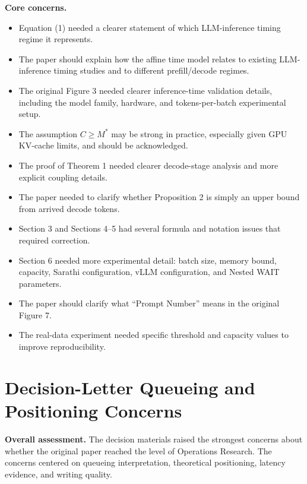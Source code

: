 \documentclass[11pt]{article}
\begin{document}
\textbf{Core concerns.}
\begin{itemize}
    \item Equation (1) needed a clearer statement of which LLM-inference timing regime it represents.
    \item The paper should explain how the affine time model relates to existing LLM-inference timing studies and to different prefill/decode regimes.
    \item The original Figure 3 needed clearer inference-time validation details, including the model family, hardware, and tokens-per-batch experimental setup.
    \item The assumption \(C \ge M^*\) may be strong in practice, especially given GPU KV-cache limits, and should be acknowledged.
    \item The proof of Theorem 1 needed clearer decode-stage analysis and more explicit coupling details.
    \item The paper needed to clarify whether Proposition 2 is simply an upper bound from arrived decode tokens.
    \item Section 3 and Sections 4--5 had several formula and notation issues that required correction.
    \item Section 6 needed more experimental detail: batch size, memory bound, capacity, Sarathi configuration, vLLM configuration, and Nested WAIT parameters.
    \item The paper should clarify what ``Prompt Number'' means in the original Figure 7.
    \item The real-data experiment needed specific threshold and capacity values to improve reproducibility.
\end{itemize}

\section*{Decision-Letter Queueing and Positioning Concerns}

\textbf{Overall assessment.} The decision materials raised the strongest concerns about whether the original paper reached the level of Operations Research. The concerns centered on queueing interpretation, theoretical positioning, latency evidence, and writing quality.
\end{document}
